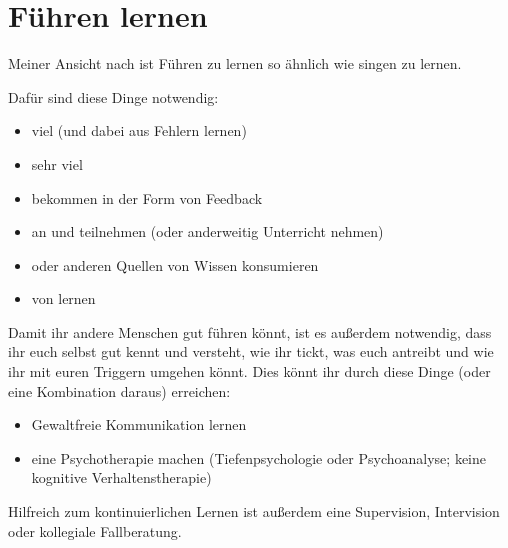 \section{Führen lernen}
\label{fuehren-lernen}
\label{fuehrung-lernen}

Meiner Ansicht nach ist Führen zu lernen so ähnlich wie singen zu lernen.

Dafür sind diese Dinge notwendig:

\begin{itemize}
  \item viel  (und dabei aus Fehlern lernen)
  \item sehr viel  
  \item {} bekommen in der Form von Feedback  
  \item an  und  teilnehmen (oder anderweitig Unterricht nehmen)
  \item {} oder anderen Quellen von Wissen konsumieren
  \item von  lernen
\end{itemize}

Damit ihr andere Menschen gut führen könnt, ist es außerdem notwendig, dass ihr euch selbst gut kennt und versteht, wie ihr tickt, was euch antreibt und wie ihr mit euren Triggern umgehen könnt. Dies könnt ihr durch diese Dinge (oder eine Kombination daraus) erreichen:

\begin{itemize}
  \item Gewaltfreie Kommunikation lernen 
  \item eine Psychotherapie machen (Tiefenpsychologie oder Psychoanalyse; keine kognitive Verhaltenstherapie) 
\end{itemize}

Hilfreich zum kontinuierlichen Lernen ist außerdem eine Supervision, Intervision oder kollegiale Fallberatung.
